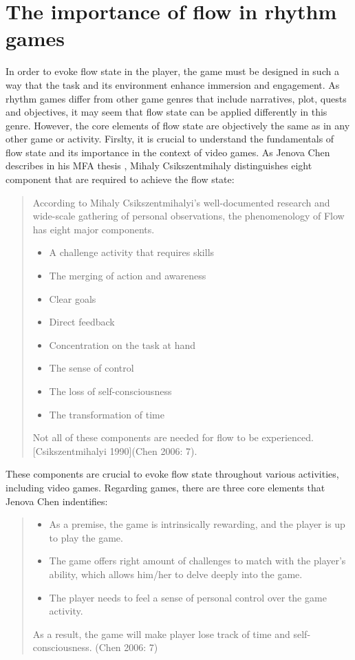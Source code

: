 \section{The importance of flow in rhythm games}
In order to evoke flow state in the player, the game must be designed in such a way that the task and its environment enhance immersion and engagement. As rhythm games differ from other game genres that include narratives, plot, quests and objectives, it may seem that flow state can be applied differently in this genre. However, the core elements of flow state are objectively the same as in any other game or activity.
Firslty, it is crucial to understand the fundamentals of flow state and its importance in the context of video games. As Jenova Chen describes in his MFA thesis \cite{chen2006flow}, Mihaly Csikszentmihaly distinguishes eight component that are required to achieve the flow state:
\begin{quote}
According to Mihaly Csikszentmihalyi’s well-documented research and wide-scale
gathering of personal observations, the phenomenology of Flow has eight major
components.
\begin {itemize}
\item A challenge activity that requires skills
\item The merging of action and awareness
\item Clear goals
\item Direct feedback
\item Concentration on the task at hand
\item The sense of control
\item The loss of self-consciousness
\item The transformation of time
\end {itemize}
Not all of these components are needed for flow to be experienced. [Csikszentmihalyi 1990](Chen 2006: 7).
\end{quote}

These components are crucial to evoke flow state throughout various activities, including video games. Regarding games, there are three core elements that Jenova Chen indentifies:
\begin{quote}
\begin {itemize}
\item As a premise, the game is intrinsically rewarding, and the player is up to play the game.
\item The game offers right amount of challenges to match with the player’s ability, which allows him/her to delve deeply into the game.
\item The player needs to feel a sense of personal control over the game activity. 
\end {itemize}
As a result, the game will make player lose track of time and self-consciousness. (Chen 2006: 7)
\end{quote}


